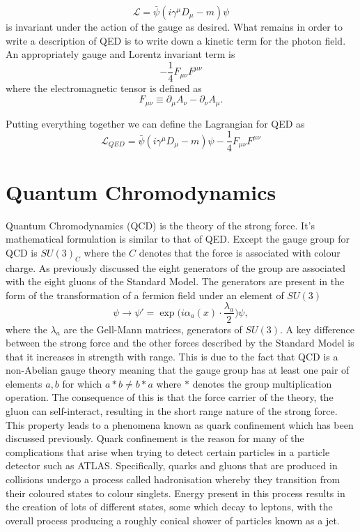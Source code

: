 \begin{equation}
  \label{eq:dirac-cov} \mathcal{L} = \bar{\psi}(i\gamma^{\mu}D_{\mu} - m)\psi
\end{equation} is invariant under the action of the gauge as desired. What
remains in order to write a description of QED is to write down a kinetic term
for the photon field. An appropriately gauge and Lorentz invariant term is
\begin{equation}
  \label{eq:em-kinetic} -\frac{1}{4}F_{\mu\nu}F^{\mu\nu}
\end{equation} where the electromagnetic tensor is defined as
\begin{equation}
  \label{eq:em-tensor} F_{\mu\nu} \equiv \partial_{\mu}A_{\nu} -
\partial_{\nu}A_{\mu}.
\end{equation}

Putting everything together we can define the Lagrangian for QED as
\begin{equation}
  \label{eq:qed} \mathcal{L}_{QED} = \bar{\psi}(i\gamma^{\mu}D_{\mu} - m)\psi
-\frac{1}{4}F_{\mu\nu}F^{\mu\nu}
\end{equation}

\section{Quantum Chromodynamics}

Quantum Chromodynamics (QCD) is the theory of the strong force. It's
mathematical formulation is similar to that of QED. Except the gauge group for
QCD is $SU(3)_C$ where the $C$ denotes that the force is associated with colour
charge. As previously discussed the eight generators of the group are associated
with the eight gluons of the Standard Model. The generators are present in the
form of the transformation of a fermion field under an element of $SU(3)$
\begin{equation}
  \label{eq:su3-trans} \psi \rightarrow \psi' =
\exp\Big({i\alpha_{a}(x)\cdot\frac{\lambda_{a}}{2}}\Big)\psi,
\end{equation} where the $\lambda_a$ are the Gell-Mann matrices, generators of
$SU(3)$. A key difference between the strong force and the other forces
described by the Standard Model is that it increases in strength with range.
This is due to the fact that QCD is a non-Abelian gauge theory meaning that the
gauge group has at least one pair of elements $a, b$ for which $a * b \neq b *
a$ where $*$ denotes the group multiplication operation. The consequence of this
is that the force carrier of the theory, the gluon can self-interact, resulting
in the short range nature of the strong force. This property leads to a
phenomena known as quark confinement which has been discussed previously. Quark
confinement is the reason for many of the complications that arise when trying
to detect certain particles in a particle detector such as ATLAS. Specifically,
quarks and gluons that are produced in collisions undergo a process called
hadronisation whereby they transition from their coloured states to colour
singlets. Energy present in this process results in the creation of lots of
different states, some which decay to leptons, with the overall process
producing a roughly conical shower of particles known as a jet.

